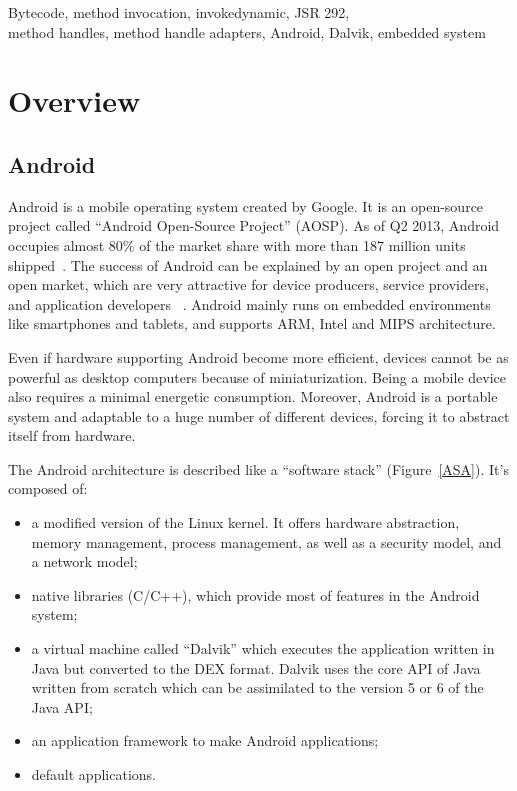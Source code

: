 \documentclass{sig-alternate}
\def \DALVIK{Dalvik\xspace}
\def \ANDROID{Android\xspace}
\def \DEX{DEX\xspace}
\begin{document}


\keywords
Bytecode, method invocation, invokedynamic, JSR 292,\\
method handles, method handle adapters, \ANDROID, Dalvik, embedded system

\newpage
\section{Overview}

  \subsection{\ANDROID}

    \ANDROID is a mobile operating system created by Google.
    It is an open-source project called ``\ANDROID Open-Source Project'' (AOSP).
    As of Q2 2013, \ANDROID occupies almost 80\% of the market share with more than 187 million units shipped~\cite{idc-website}.
    The success of \ANDROID can be explained by an open project and an open market,
    which are very attractive for device producers, service providers, and application developers
   ~\cite{ieee-butler-android-landscape}\cite{ieee-paulson-shift-dynamic-languages}.
    \ANDROID mainly runs on embedded environments like smartphones and tablets,
    and supports ARM, Intel and MIPS architecture.
    
    Even if hardware supporting \ANDROID become more efficient,
    devices cannot be as powerful as desktop computers because of miniaturization.
    Being a mobile device also requires a minimal energetic consumption.
    Moreover, \ANDROID is a portable system and adaptable to a huge number of different devices,
    forcing it to abstract itself from hardware.

    The \ANDROID architecture is described like a ``software stack'' (Figure~\ref{ASA}).
    It's composed of:
    \begin{itemize}
      \item a modified version of the Linux kernel.
        It offers hardware abstraction, memory management, process management, as well as a security model, and a network model;
      \item native libraries (C/C++),
        which provide most of features in the \ANDROID system;
      \item a virtual machine called ``\DALVIK''
        which executes the application written in Java but converted to the \DEX format.
        \DALVIK uses the core API of Java written from scratch
        which can be assimilated to the version 5 or 6 of the Java API;
      \item an application framework to make \ANDROID applications;
      \item default applications.
    \end{itemize}
\end{document}
